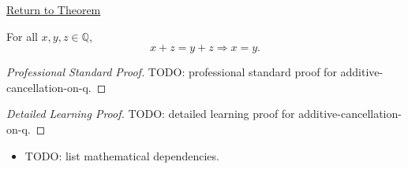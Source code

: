 \newpage
{}
\label{prf:additive-cancellation-on-q}

\begin{remark*}[Return]
\hyperref[cor:additive-cancellation-on-q]{Return to Theorem}
\end{remark*}

\begin{corollary*}
For all $x,y,z\in\mathbb{Q}$,
\[
x+z=y+z
\Longrightarrow
x=y.
\]
\end{corollary*}

\begin{proof}[Professional Standard Proof]
\LRAProofBodyStart
TODO: professional standard proof for additive-cancellation-on-q.
\end{proof}

\begin{proof}[Detailed Learning Proof]
\LRAProofBodyStart
TODO: detailed learning proof for additive-cancellation-on-q.
\end{proof}

\begin{remark*}
\end{remark*}

\begin{dependencies}
\begin{itemize}
  \item TODO: list mathematical dependencies.
\end{itemize}
\end{dependencies}

\clearpage
